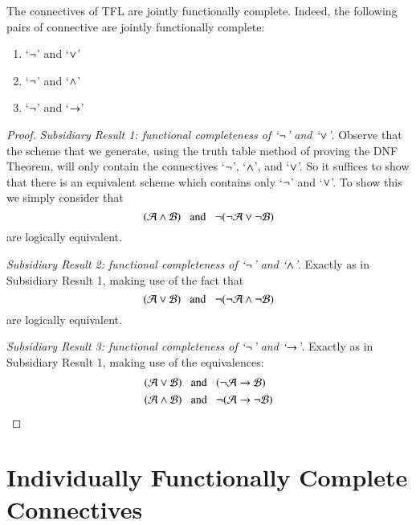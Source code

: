 \begin{theorem}
    The connectives of TFL are jointly functionally complete. Indeed, the following pairs of connective are jointly functionally complete: \begin{enumerate}
        \item `$\neg$' and `$\vee$'
        \item `$\neg$' and `$\wedge$'
        \item `$\neg$' and `$\rightarrow$'
    \end{enumerate}
\end{theorem}
\begin{proof}
    \emph{Subsidiary Result 1: functional completeness of `$\neg$' and `$\vee$'}. Observe that the scheme that we generate, using the truth table method of proving the DNF Theorem, will only contain the connectives `$\neg$', `$\wedge$', and `$\vee$'. So it suffices to show that there is an equivalent scheme which contains only `$\neg$' and `$\vee$'. To show this we simply consider that \begin{equation*}
        (\mathcal{A}\wedge\mathcal{B}) \;\;\text{ and }\;\;\neg(\neg\mathcal{A}\vee\neg\mathcal{B})
    \end{equation*}
    are logically equivalent.

    \emph{Subsidiary Result 2: functional completeness of `$\neg$' and `$\wedge$'}. Exactly as in Subsidiary Result 1, making use of the fact that \begin{equation*}
        (\mathcal{A}\vee\mathcal{B}) \;\;\text{ and }\;\;\neg(\neg\mathcal{A}\wedge\neg\mathcal{B})
    \end{equation*}
    are logically equivalent.

    \emph{Subsidiary Result 3: functional completeness of `$\neg$' and `$\rightarrow$'}. Exactly as in Subsidiary Result 1, making use of the equivalences: \begin{align*}
        (\mathcal{A}\vee\mathcal{B})\;\;&\text{ and }\;\;(\neg\mathcal{A}\rightarrow \mathcal{B}) \\
        (\mathcal{A}\wedge\mathcal{B})\;\;&\text{ and }\;\;\neg(\mathcal{A}\rightarrow\neg\mathcal{B})
    \end{align*}
\end{proof}

\section{ Individually Functionally Complete Connectives}

